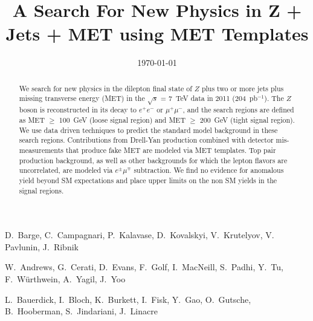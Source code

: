 \documentclass{cmspaper}
\newcommand{\Z}{$Z$ } %
\newcommand{\lumi}{204~pb$^{-1}$}
\newcommand{\signalmetl}{100}
\newcommand{\signalmett}{200}
\begin{document}
\begin{titlepage}


  \date{\today}
 
  \title{A Search For New Physics in Z + Jets + MET using MET Templates}

  \begin{Authlist}
    D.~Barge, C.~Campagnari, P.~Kalavase, D.~Kovalskyi, V.~Krutelyov, V. Pavlunin, J.~Ribnik

    W.~Andrews, G.~Cerati, D.~Evans, F.~Golf, I.~MacNeill, S.~Padhi, Y.~Tu, F.~W\"urthwein, 
	A.~Yagil, J.~Yoo

	L.~Bauerdick, I.~Bloch, K.~Burkett, I.~Fisk, Y.~Gao, O.~Gutsche, B.~Hooberman, 
	S.~Jindariani, J.~Linacre
  \end{Authlist}

  \begin{abstract}

\begin{comment}

We search for new physics in the dilepton final state of Z plus two or more jets plus missing transverse 
energy (MET) in the $\sqrt{s}$ = 7~TeV data in 2011 (204~pb$^{-1}$). 
The Z boson is reconstructed in its decay to $e^+e^-$ or $\mu^+\mu^-$, and
the search regions are defined as MET $\ge$ 100 GeV (loose signal region) and 
MET $\ge$ 200 GeV (tight signal region). 
We use data driven techniques to predict the standard model background in these
search regions. 
Contributions from Drell-Yan production combined with detector mis-measurements that produce 
fake MET are modeled via MET templates.
Top pair production background, as well as other backgrounds for which the lepton
flavors are uncorrelated, are modeled via $e^\pm\mu^\mp$ subtraction.
We find no evidence
for anomalous yield beyond SM expectations and place upper limits
on the non SM yields in the signal regions.

\end{comment}


We search for new physics in the dilepton final state of \Z plus two or more jets plus missing transverse 
energy (MET) in the $\sqrt{s}$ = 7~TeV data in 2011 (\lumi). 
The \Z boson is reconstructed in its decay to $e^+e^-$ or $\mu^+\mu^-$, and
the search regions are defined as MET $\ge$ \signalmetl~GeV (loose signal region) and 
MET $\ge$ \signalmett~GeV (tight signal region). 
We use data driven techniques to predict the standard model background in these
search regions. 
Contributions from Drell-Yan production combined with detector mis-measurements that produce 
fake MET are modeled via MET templates.
Top pair production background, as well as other backgrounds for which the lepton
flavors are uncorrelated, are modeled via $e^\pm\mu^\mp$ subtraction.
We find no evidence
for anomalous yield beyond SM expectations and place upper limits
on the non SM yields in the signal regions.



\end{abstract}
\end{titlepage}
\end{document}
